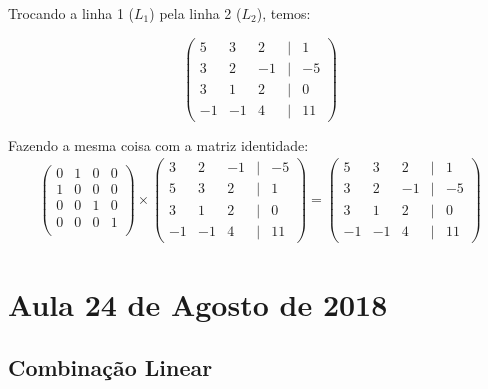 \documentclass[12pt,a4paper]{article}
\begin{document}
Trocando a linha 1 ($L_1$) pela linha 2 ($L_2$), temos:

\[
\begin{pmatrix}
5 & 3 & 2 & | & 1\\
3 & 2 & -1 & | & -5\\
3 & 1 & 2 & | & 0\\
-1 & -1 & 4 & | & 11
\end{pmatrix}
\]

Fazendo a mesma coisa com a matriz identidade:
\begin{align*}
\begin{pmatrix}
0 & 1 & 0 & 0\\
1 & 0 & 0 & 0\\
0 & 0 & 1 & 0\\
0 & 0 & 0 & 1\\
\end{pmatrix}\times
\begin{pmatrix}
3 & 2 & -1 & | & -5\\
5 & 3 & 2 & | & 1\\
3 & 1 & 2 & | & 0\\
-1 & -1 & 4 & | & 11
\end{pmatrix}=
\begin{pmatrix}
5 & 3 & 2 & | & 1\\
3 & 2 & -1 & | & -5\\
3 & 1 & 2 & | & 0\\
-1 & -1 & 4 & | & 11
\end{pmatrix}
\end{align*}

\section{Aula 24 de Agosto de 2018}
\subsection{Combinação Linear}
\end{document}
